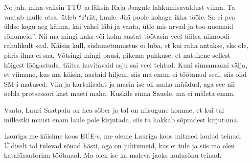 No jah, mina valisin TTÜ ja läksin Raja Jaagule lahkumisavaldust viima. Ta vaatab mulle otsa, ütleb \enquote{Priit, kuule. Jää poole kohaga ikka tööle. Sa ei pea üldse kogu aeg käima, käi vahel läbi ja vaata, ütle mis arvad ja too uuemaid sõnumeid}. Nii ma mingi kaks või kolm aastat töötasin veel täitsa niimoodi rahulikult seal. Käisin küll,  südametunnistus ei luba, et kui raha antakse, eks ole, päris ilma ei saa. Võtsingi mingi pausi, pikema puhkuse, et natukene sellest kõigest lõõgastuda, täitsa huvitavaid asju sai veel tehtud. Kuni sinnamaani välja, et viimane, kus ma käisin, aastaid hiljem, siis ma enam ei töötanud seal, siis olid SM-i matused. Viin ja kartulisalat ja masin ise oli maha müüdud, aga see nii-öelda protsessori kast maeti maha. Kuskile sinna Sauele, ma ei mäleta enam. 


Vaata, Lauri Saatpalu on hea sõber ja tal on niisugune komme, et kui tal millestki muust enam laule pole kirjutada, siis ta hakkab sõpradest kirjutama. 

Lauriga me käisime koos EÜE-s, me oleme Lauriga koos mitmed laulud teinud. Üldiselt tal tulevad sõnad hästi, aga on juhtumeid, kus ei tule ja siis ma olen katalüsaatorina  töötanud. Ma olen ise ka maleva jaoks laulusõnu teinud. 

